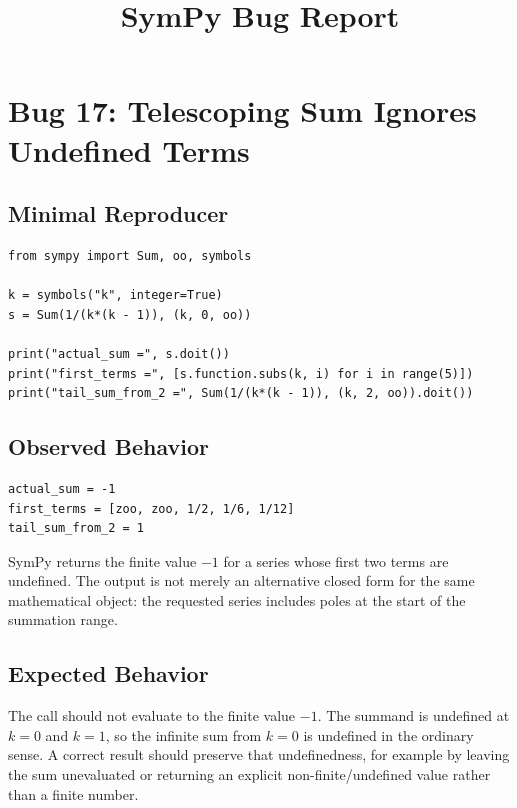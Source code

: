 \documentclass[11pt]{article}
\title{SymPy Bug Report}
\date{}
\begin{document}
\author{}
\maketitle

\section{Bug 17: Telescoping Sum Ignores Undefined Terms}

\subsection{Minimal Reproducer}

\medskip

\begin{lstlisting}[style=bugpython]
from sympy import Sum, oo, symbols

k = symbols("k", integer=True)
s = Sum(1/(k*(k - 1)), (k, 0, oo))

print("actual_sum =", s.doit())
print("first_terms =", [s.function.subs(k, i) for i in range(5)])
print("tail_sum_from_2 =", Sum(1/(k*(k - 1)), (k, 2, oo)).doit())
\end{lstlisting}

\subsection{Observed Behavior}

\medskip

\begin{lstlisting}[style=bugpython]
actual_sum = -1
first_terms = [zoo, zoo, 1/2, 1/6, 1/12]
tail_sum_from_2 = 1
\end{lstlisting}

SymPy returns the finite value \(-1\) for a series whose first two terms are undefined. The output is not merely an alternative closed form for the same mathematical object: the requested series includes poles at the start of the summation range.

\subsection{Expected Behavior}

The call should not evaluate to the finite value \(-1\). The summand is undefined at \(k=0\) and \(k=1\), so the infinite sum from \(k=0\) is undefined in the ordinary sense. A correct result should preserve that undefinedness, for example by leaving the sum unevaluated or returning an explicit non-finite/undefined value rather than a finite number.
\end{document}
